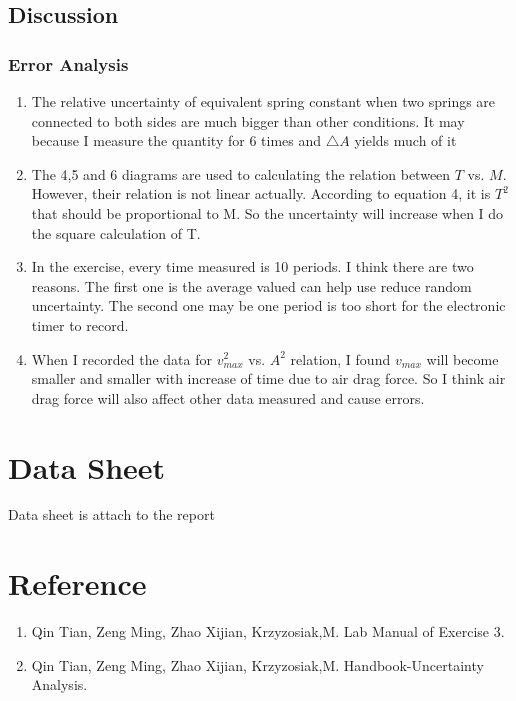 \documentclass[12pt]{article}
\begin{document}
\subsection{Discussion}
\subsubsection{Error Analysis}
\begin{enumerate}
\item The relative uncertainty of equivalent spring constant when two springs are connected to both sides are much bigger than other conditions. It may because I measure the quantity for 6 times and $\bigtriangleup A$ yields much of it
\item The 4,5 and 6 diagrams are used to calculating the relation between $T$ vs. $M$. However, their relation is not linear actually. According to equation 4, it is $T^2$ that should be proportional to M. So the uncertainty will increase when I do the square calculation of T.
\item In the exercise, every time measured is 10 periods. I think there are two reasons. The first one is  the average valued can help use reduce random uncertainty. The second one may be one period is too short for the electronic timer to record. 
\item When I recorded the data for $v_{max}^2$ vs. $A^2$ relation, I found $v_{max}$ will become smaller and smaller with increase of time due to air drag force. So I think air drag force will also affect other data measured and cause errors.
\end{enumerate}
\section{Data Sheet}
Data sheet is attach to the report
\section{Reference}
\begin{enumerate}[-]
\item Qin Tian, Zeng Ming, Zhao Xijian, Krzyzosiak,M. Lab Manual of Exercise 3.
\item Qin Tian, Zeng Ming, Zhao Xijian, Krzyzosiak,M. Handbook-Uncertainty Analysis.
\end{enumerate}
\end{document}

